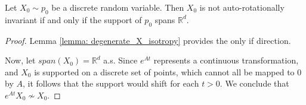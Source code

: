 \documentclass[twoside,11pt]{article}
\newcommand{\R} {\mathbb R}
\newcommand{\cov} {\mathrm{Cov}}
\begin{document}
\begin{prop}
Let $X_0 \sim p_0$ be a discrete random variable. Then $X_0$ is not auto-rotationally invariant if and only if the support of $p_0$ spans $\R^d$.
\label{prop: discrete_auto_rotate}
\end{prop}
\begin{proof}
Lemma \ref{lemma: degenerate_X_isotropy} provides the only if direction. 

Now, let $span(X_0)=\R^d$ a.s. Since \( e^{At} \) represents a continuous transformation, and \( X_0 \) is supported on a discrete set of points, which cannot all be mapped to $0$ by $A$, it follows that the support would shift for each $t>0$. We conclude that $e^{At}X_0 \not\sim X_0 $.
\end{proof}

\end{document}
